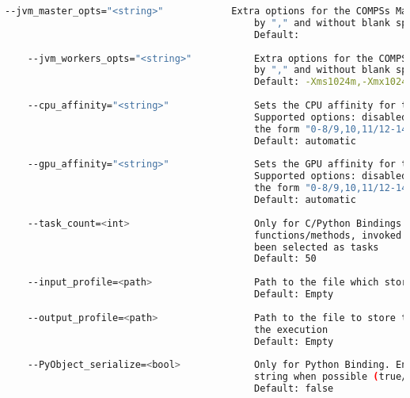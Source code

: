 \begin{lstlisting}[language=bash]
    --jvm_master_opts="<string>"            Extra options for the COMPSs Master JVM. Each option separed
                                            by "," and without blank spaces (Notice the quotes)
                                            Default: 
                                            
    --jvm_workers_opts="<string>"           Extra options for the COMPSs Workers JVMs. Each option separed
                                            by "," and without blank spaces (Notice the quotes)
                                            Default: -Xms1024m,-Xmx1024m,-Xmn400m
                                            
    --cpu_affinity="<string>"               Sets the CPU affinity for the workers
                                            Supported options: disabled, automatic, user defined map of
                                            the form "0-8/9,10,11/12-14,15,16"
                                            Default: automatic
                                            
    --gpu_affinity="<string>"               Sets the GPU affinity for the workers
                                            Supported options: disabled, automatic, user defined map of
                                            the form "0-8/9,10,11/12-14,15,16"
                                            Default: automatic
                                            
    --task_count=<int>                      Only for C/Python Bindings. Maximum number of different
                                            functions/methods, invoked from the application, that have
                                            been selected as tasks
                                            Default: 50
                                            
    --input_profile=<path>                  Path to the file which stores the input application profile
                                            Default: Empty
                                            
    --output_profile=<path>                 Path to the file to store the application profile at the end of
                                            the execution
                                            Default: Empty 
                                            
    --PyObject_serialize=<bool>             Only for Python Binding. Enable the object serialization to
                                            string when possible (true/false).
                                            Default: false
                                            

\end{lstlisting}
